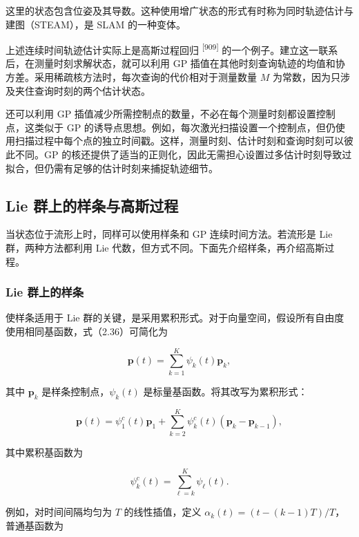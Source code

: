 这里的状态包含位姿及其导数。这种使用增广状态的形式有时称为同时轨迹估计与建图（STEAM），是 SLAM 的一种变体。

上述连续时间轨迹估计实际上是高斯过程回归 \textsuperscript{[909]} 的一个例子。建立这一联系后，在测量时刻求解状态，就可以利用 GP 插值在其他时刻查询轨迹的均值和协方差。采用稀疏核方法时，每次查询的代价相对于测量数量 $M$ 为常数，因为只涉及夹住查询时刻的两个估计状态。

还可以利用 GP 插值减少所需控制点的数量，不必在每个测量时刻都设置控制点，这类似于 GP 的诱导点思想。例如，每次激光扫描设置一个控制点，但仍使用扫描过程中每个点的独立时间戳。这样，测量时刻、估计时刻和查询时刻可以彼此不同。GP 的核还提供了适当的正则化，因此无需担心设置过多估计时刻导致过拟合，但仍需有足够的估计时刻来捕捉轨迹细节。

\subsection{Lie 群上的样条与高斯过程}

当状态位于流形上时，同样可以使用样条和 GP 连续时间方法。若流形是 Lie 群，两种方法都利用 Lie 代数，但方式不同。下面先介绍样条，再介绍高斯过程。

\subsubsection{Lie 群上的样条}

使样条适用于 Lie 群的关键，是采用累积形式。对于向量空间，假设所有自由度使用相同基函数，式（2.36）可简化为

\begin{equation}
\boldsymbol {p} (t) = \sum_ {k = 1} ^ {K} \psi_ {k} (t) \boldsymbol {p} _ {k},\tag{2.53}
\end{equation}

其中 $\pmb p_k$ 是样条控制点，$\psi_k(t)$ 是标量基函数。将其改写为累积形式：

\begin{equation}
\boldsymbol {p} (t) = \psi_ {1} ^ {c} (t) \boldsymbol {p} _ {1} + \sum_ {k = 2} ^ {K} \psi_ {k} ^ {c} (t) \left(\boldsymbol {p} _ {k} - \boldsymbol {p} _ {k - 1}\right),\tag{2.54}
\end{equation}

其中累积基函数为

\begin{equation}
\psi_ {k} ^ {c} (t) = \sum_ {\ell = k} ^ {K} \psi_ {\ell} (t).\tag{2.55}
\end{equation}

例如，对时间间隔均匀为 $T$ 的线性插值，定义 $\alpha_k(t)=(t-(k-1)T)/T$，普通基函数为

